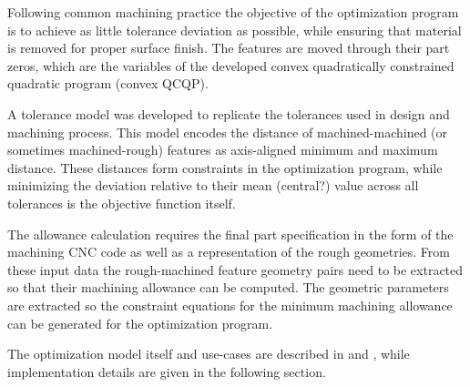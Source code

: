\documentclass{juliacon}
\begin{document}
Following common machining practice the objective of the optimization program is to achieve as little tolerance deviation as possible, while ensuring that material is removed for proper surface finish.
The features are moved through their part zeros, which are the variables of the developed convex quadratically constrained quadratic program (convex QCQP).

A tolerance model was developed to replicate the tolerances used in design and machining process.
This model encodes the distance of machined-machined (or sometimes machined-rough) features as axis-aligned minimum and maximum distance.
These distances form constraints in the optimization program, while minimizing the deviation relative to their mean (central?) value across all tolerances is the objective function itself.

The allowance calculation requires the final part specification in the form of the machining CNC code as well as a representation of the rough geometries.
From these input data the rough-machined feature geometry pairs need to be extracted so that their machining allowance can be computed.
The geometric parameters are extracted so the constraint equations for the minimum machining allowance can be generated for the optimization program.

The optimization model itself and use-cases are described in \cite{cserteg:2023_CMS} and \cite{cserteg:2023_Annals}, while implementation details are given in the following section.




\end{document}
